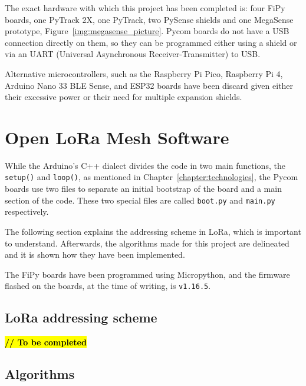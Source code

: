 		The exact hardware with which this project has been completed is: four FiPy boards, one PyTrack 2X, one PyTrack, two PySense shields and one MegaSense prototype, Figure~\ref{img:megasense_picture}.
		Pycom boards do not have a USB connection directly on them, so they can be programmed either using a shield or via an UART (Universal Asynchronous Receiver-Transmitter) to USB.
		
		Alternative microcontrollers, such as the Raspberry Pi Pico, Raspberry Pi 4, Arduino Nano 33 BLE Sense, and ESP32 boards have been discard given either their excessive power or their need for multiple expansion shields.
				
	\section{Open LoRa Mesh Software}\label{sec:software_solution}
	
		While the Arduino's C++ dialect divides the code in two main functions, the \texttt{setup()} and \texttt{loop()}, as mentioned in Chapter~\ref{chapter:technologies}, the Pycom boards use two files to separate an initial bootstrap of the board and a main section of the code.
		These two special files are called \texttt{boot.py} and \texttt{main.py} respectively.
		
		The following section explains the addressing scheme in LoRa, which is important to understand.
		Afterwards, the algorithms made for this project are delineated and it is shown how they have been implemented.
		
		The FiPy boards have been programmed using Micropython, and the firmware flashed on the boards, at the time of writing, is \texttt{v1.16.5}.
		
		\subsection{LoRa addressing scheme}\label{subsec:lora_addressing}
		
			\textbf{\textcolor{red}{\hl{// To be completed}}}
		
		
		
		
		
		\subsection{Algorithms}\label{subsec:algorithms}
	
